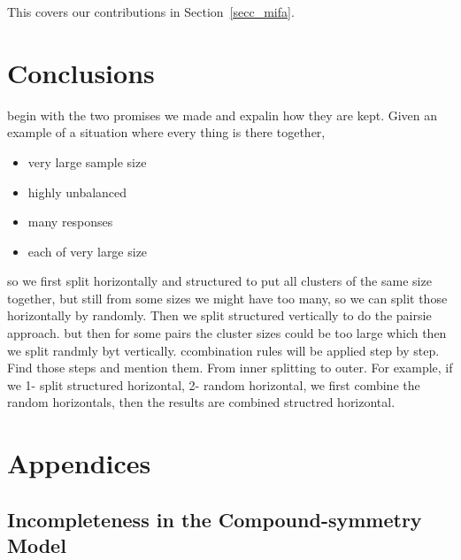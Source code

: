 \documentclass[11pt,a5paper,twoside]{book}
\begin{document}
This covers our contributions in Section~\ref{secc_mifa}.

\chapter{Conclusions}

begin with the two promises we made and expalin how they are kept. Given an example of a situation where every thing is there together, 

\begin{itemize}
\item very large sample size
\item highly unbalanced
\item many responses
\item each of very large size
\end{itemize}

so we first split horizontally and structured to put all clusters of the same size together, but still from some sizes we might have too many, so we can split those horizontally by randomly. Then we split structured vertically to do the pairsie approach. but then for some pairs the cluster sizes could be too large which then we split randmly byt vertically. ccombination rules will be applied step by step. Find those steps and mention them. From inner splitting to outer. For example, if we 1- split structured horizontal, 2- random horizontal, we first combine the random horizontals, then the results are combined structred horizontal. 



\chapter{Appendices}

\backmatter

\appendix
\setcounter{equation}{0}
\renewcommand{\theequation}{A.\arabic{equation}}
\renewcommand{\thesection}{A.\arabic{section}}



\section{Incompleteness in the Compound-symmetry Model} \label{appA}
\end{document}
